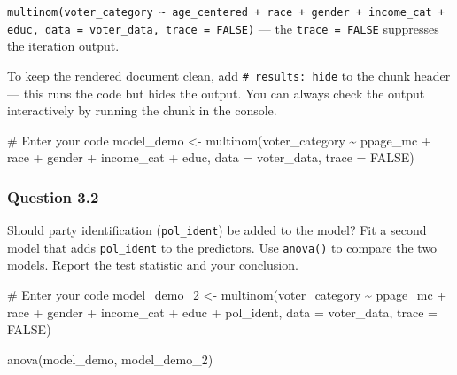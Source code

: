 \documentclass[
  letterpaper,
  DIV=11,
  numbers=noendperiod]{scrartcl}
\newenvironment{Shaded}{\begin{snugshade}}{\end{snugshade}}
\newcommand{\AttributeTok}[1]{\textcolor[rgb]{0.40,0.45,0.13}{#1}}
\newcommand{\CommentTok}[1]{\textcolor[rgb]{0.37,0.37,0.37}{#1}}
\newcommand{\ConstantTok}[1]{\textcolor[rgb]{0.56,0.35,0.01}{#1}}
\newcommand{\FunctionTok}[1]{\textcolor[rgb]{0.28,0.35,0.67}{#1}}
\newcommand{\NormalTok}[1]{\textcolor[rgb]{0.00,0.23,0.31}{#1}}
\newcommand{\OtherTok}[1]{\textcolor[rgb]{0.00,0.23,0.31}{#1}}
\newcommand{\SpecialCharTok}[1]{\textcolor[rgb]{0.37,0.37,0.37}{#1}}
\begin{document}
\begin{tcolorbox}[enhanced jigsaw, toprule=.15mm, opacitybacktitle=0.6, coltitle=black, opacityback=0, bottomrule=.15mm, left=2mm, colframe=quarto-callout-tip-color-frame, leftrule=.75mm, toptitle=1mm, colbacktitle=quarto-callout-tip-color!10!white, rightrule=.15mm, colback=white, title=\textcolor{quarto-callout-tip-color}{\faLightbulb}\hspace{0.5em}{Hint}, arc=.35mm, bottomtitle=1mm, titlerule=0mm, breakable]

\texttt{multinom(voter\_category\ \textasciitilde{}\ age\_centered\ +\ race\ +\ gender\ +\ income\_cat\ +\ educ,\ data\ =\ voter\_data,\ trace\ =\ FALSE)}
--- the \texttt{trace\ =\ FALSE} suppresses the iteration output.

To keep the rendered document clean, add
\texttt{\#\textbar{}\ results:\ hide} to the chunk header --- this runs
the code but hides the output. You can always check the output
interactively by running the chunk in the console.

\end{tcolorbox}

\begin{Shaded}
\begin{Highlighting}[]
\CommentTok{\# Enter your code}
\NormalTok{model\_demo }\OtherTok{\textless{}{-}} \FunctionTok{multinom}\NormalTok{(voter\_category }\SpecialCharTok{\textasciitilde{}}\NormalTok{ ppage\_mc }\SpecialCharTok{+}\NormalTok{ race }\SpecialCharTok{+}\NormalTok{ gender }\SpecialCharTok{+}\NormalTok{ income\_cat }\SpecialCharTok{+}\NormalTok{ educ, }\AttributeTok{data =}\NormalTok{ voter\_data, }\AttributeTok{trace =} \ConstantTok{FALSE}\NormalTok{)}
\end{Highlighting}
\end{Shaded}

\subsubsection*{Question 3.2}\label{question-3.2}

Should party identification (\texttt{pol\_ident}) be added to the model?
Fit a second model that adds \texttt{pol\_ident} to the predictors. Use
\texttt{anova()} to compare the two models. Report the test statistic
and your conclusion.

\begin{Shaded}
\begin{Highlighting}[]
\CommentTok{\# Enter your code}
\NormalTok{model\_demo\_2 }\OtherTok{\textless{}{-}} \FunctionTok{multinom}\NormalTok{(voter\_category }\SpecialCharTok{\textasciitilde{}}\NormalTok{ ppage\_mc }\SpecialCharTok{+}\NormalTok{ race }\SpecialCharTok{+}\NormalTok{ gender }\SpecialCharTok{+}\NormalTok{ income\_cat }\SpecialCharTok{+}\NormalTok{ educ }\SpecialCharTok{+}\NormalTok{ pol\_ident, }\AttributeTok{data =}\NormalTok{ voter\_data, }\AttributeTok{trace =} \ConstantTok{FALSE}\NormalTok{)}

\FunctionTok{anova}\NormalTok{(model\_demo, model\_demo\_2)}
\end{Highlighting}
\end{Shaded}
\end{document}
